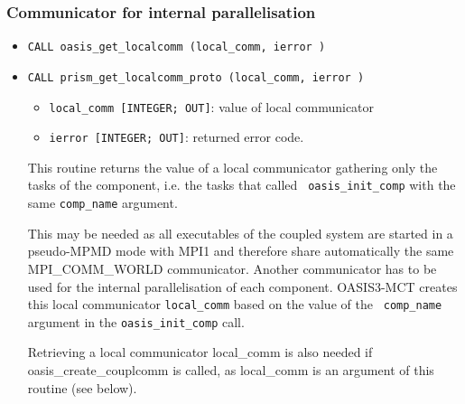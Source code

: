 \subsubsection{Communicator for internal parallelisation}
\label{subsec_MPI1}

\begin{itemize}
\item {\tt CALL oasis\_get\_localcomm (local\_comm, ierror )}
\item {\tt CALL prism\_get\_localcomm\_proto (local\_comm, ierror )}

  \begin{itemize}
  \item {\tt local\_comm [INTEGER; OUT]}: value of local communicator
  \item {\tt ierror [INTEGER; OUT]}: returned error code.
  \end{itemize}

  This routine returns the value of a local communicator gathering
  only the tasks of the component, i.e. the tasks that called {\tt
  oasis\_init\_comp} with the same {\tt comp\_name}
argument.

  This may be needed as all executables of the coupled system are started in a pseudo-MPMD
  mode with MPI1 and therefore share automatically the same MPI\_COMM\_WORLD
  communicator.  Another communicator has to be used for the internal
  parallelisation of each component. OASIS3-MCT creates this local
  communicator {\tt local\_comm} based on the value of the {\tt
    comp\_name} argument in the {\tt oasis\_init\_comp} call.

  Retrieving a local communicator local\_comm is also needed if
  oasis\_create\_couplcomm is called, as local\_comm is an argument of this routine (see below).

\end{itemize}


